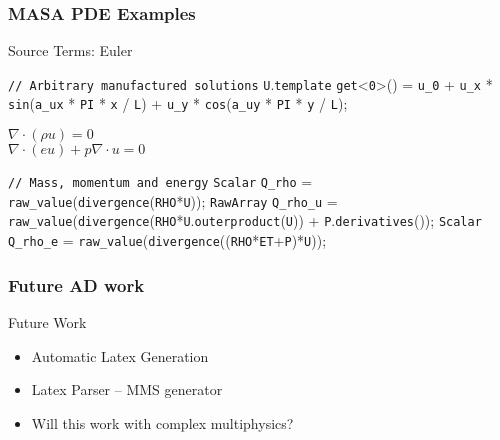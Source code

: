 \documentclass[mathserif]{beamer}
\newcommand{\data}[1]{\texttt{\color{DarkRed}#1}}
\newcommand{\comment}[1]{\texttt{\color{Red}#1}}
\newcommand{\type}[1]{\texttt{\color{DarkGreen}#1}}
\newcommand{\var}[1]{\texttt{\color{Blue}#1}}
\newcommand{\func}[1]{\texttt{\color{DarkCyan}#1}}
\newcommand{\key}[1]{\texttt{\color{Purple}#1}}
\begin{document}
\begin{frame}[fragile]
\frametitle{MASA PDE Examples}

\begin{block}{Source Terms: Euler}
\begin{semiverbatim}
\footnotesize
\comment{// Arbitrary manufactured solutions}
\var{U}.\key{template} \func{get}<\data{0}>() = \var{u_0} + \var{u_x} * \func{sin}(\var{a_ux} * \var{PI} * \var{x} / \var{L}) 
                          + \var{u_y} * \func{cos}(\var{a_uy} * \var{PI} * \var{y} / \var{L}); 
\end{semiverbatim}

 \begin{center}
  $\nabla \cdot (\rho u ) = 0$ \\
  \vspace{15pt}
  $\nabla \cdot (e u) + p \nabla \cdot u = 0$
  \end{center}
\begin{semiverbatim}
\footnotesize

\comment{// Mass, momentum and energy}
\type{Scalar}   \var{Q_rho}   = \func{raw_value}(\func{divergence}(\var{RHO}*\var{U}));
\type{RawArray} \var{Q_rho_u} = \func{raw_value}(\func{divergence}(\var{RHO}*\var{U}.\func{outerproduct}(\var{U})) +
                   \var{P}.\func{derivatives}());
 \type{Scalar}  \var{Q_rho_e} = \func{raw_value}(\func{divergence}((\var{RHO}*\var{ET}+\var{P})*\var{U}));

\end{semiverbatim}
\end{block}
\end{frame}


\begin{frame}
  \frametitle{Future AD work}

 \begin{block}{Future Work}
  \begin{itemize}
   \item Automatic Latex Generation
   \item Latex Parser -- MMS generator
   \item Will this work with complex multiphysics?
  \end{itemize}
 \end{block}
 
\end{frame}
\end{document}
